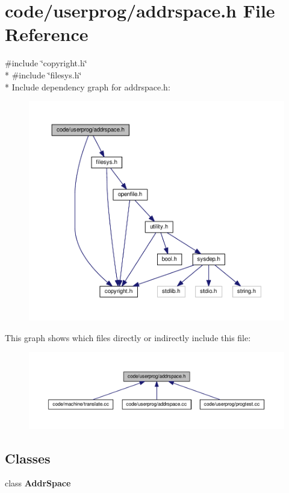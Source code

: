 \section{code/userprog/addrspace.h File Reference}
\label{addrspace_8h}
{\ttfamily \#include \char`\"{}copyright.\+h\char`\"{}}\\*
{\ttfamily \#include \char`\"{}filesys.\+h\char`\"{}}\\*
Include dependency graph for addrspace.\+h\+:
\nopagebreak
\begin{figure}[H]
\begin{center}
\leavevmode
\includegraphics[width=350pt]{addrspace_8h__incl}
\end{center}
\end{figure}
This graph shows which files directly or indirectly include this file\+:
\nopagebreak
\begin{figure}[H]
\begin{center}
\leavevmode
\includegraphics[width=350pt]{addrspace_8h__dep__incl}
\end{center}
\end{figure}
\subsection*{Classes}
\begin{DoxyCompactItemize}
\item 
class {\bf Addr\+Space}
\end{DoxyCompactItemize}
